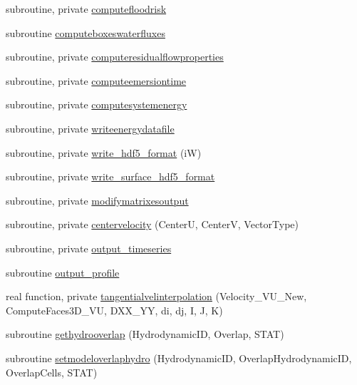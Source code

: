 \begin{DoxyCompactItemize}
subroutine, private \mbox{\hyperlink{namespacemodulehydrodynamic_a3ccbfcaea30af1d03bc8f158f2262081}{computefloodrisk}}
\item 
subroutine \mbox{\hyperlink{namespacemodulehydrodynamic_a7eac8d5b6aff29b714f987f3bedd3a6a}{computeboxeswaterfluxes}}
\item 
subroutine, private \mbox{\hyperlink{namespacemodulehydrodynamic_a8f5cfb7e074cb11c3c46454e53806111}{computeresidualflowproperties}}
\item 
subroutine, private \mbox{\hyperlink{namespacemodulehydrodynamic_a15232a4b6e4a92f5147fcf1428ebe0c0}{computeemersiontime}}
\item 
subroutine, private \mbox{\hyperlink{namespacemodulehydrodynamic_a5267d6e9c0f3efab032ca1f82881b5dd}{computesystemenergy}}
\item 
subroutine, private \mbox{\hyperlink{namespacemodulehydrodynamic_a99c46c970a39feb3ece42b919ed01d08}{writeenergydatafile}}
\item 
subroutine, private \mbox{\hyperlink{namespacemodulehydrodynamic_affc6eb8b5c260e1da6146c7a34c7849b}{write\+\_\+hdf5\+\_\+format}} (iW)
\item 
subroutine, private \mbox{\hyperlink{namespacemodulehydrodynamic_ae031a7cef6170ae4c1b13ffb602108a6}{write\+\_\+surface\+\_\+hdf5\+\_\+format}}
\item 
subroutine, private \mbox{\hyperlink{namespacemodulehydrodynamic_a855667e612812156b0ef3370781b2665}{modifymatrixesoutput}}
\item 
subroutine, private \mbox{\hyperlink{namespacemodulehydrodynamic_a7bcb9032bfe7bf84ef03ab8c66f0f159}{centervelocity}} (CenterU, CenterV, Vector\+Type)
\item 
subroutine, private \mbox{\hyperlink{namespacemodulehydrodynamic_ab09a29c4bbdb3a0c03a3e8630b2d0829}{output\+\_\+timeseries}}
\item 
subroutine \mbox{\hyperlink{namespacemodulehydrodynamic_aad9764fae86ae409938db759114d0a42}{output\+\_\+profile}}
\item 
real function, private \mbox{\hyperlink{namespacemodulehydrodynamic_a9df5dd894a61d9599540be689d68c03b}{tangentialvelinterpolation}} (Velocity\+\_\+\+V\+U\+\_\+\+New, Compute\+Faces3\+D\+\_\+\+VU, D\+X\+X\+\_\+\+YY, di, dj, I, J, K)
\item 
subroutine \mbox{\hyperlink{namespacemodulehydrodynamic_aaf559665e8122ee5d3cf650f45ac04fd}{gethydrooverlap}} (Hydrodynamic\+ID, Overlap, S\+T\+AT)
\item 
subroutine \mbox{\hyperlink{namespacemodulehydrodynamic_abd4cedd7ee17aecf0de70d7616270033}{setmodeloverlaphydro}} (Hydrodynamic\+ID, Overlap\+Hydrodynamic\+ID, Overlap\+Cells, S\+T\+AT)

\end{DoxyCompactItemize}
